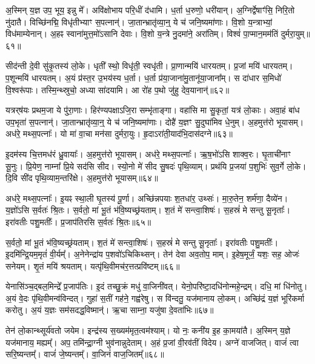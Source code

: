 अ॒स्मिन् य॒ज्ञ उप॒ भूय॒ इन्नु मे᳚।
अवि॑क्षोभाय परि॒धीं द॑धामि।
ध॒र्ता ध॒रुणो॒ धरी॑यान्।
अ॒ग्निर्द्वेषाꣳ॑सि॒ निरि॒तो नु॑दातै।
विच्छि॑नद्मि॒ विधृ॑तीभ्याꣳ स॒पत्नान्॑।
जा॒तान्भ्रातृ॑व्या॒न्॒ ये च॑ जनि॒ष्यमा॑णाः।
वि॒शो य॒न्त्राभ्यां॒ विध॑माम्येनान्।
अ॒हꣴ स्वाना॑मुत्त॒मो॑\-ऽसानि देवाः।
वि॒शो य॒न्त्रे नु॒दमा॑ने॒ अरा॑तिम्।
विश्वं॑ पा॒प्मान॒मम॑तिं दुर्मरा॒युम्॥६१॥\ip

सीद॑न्ती दे॒वी सु॑कृ॒तस्य॑ लो॒के।
धृती᳚ स्थो॒ विधृ॑ती॒ स्वधृ॑ती।
प्रा॒णान्मयि॑ धारयतम्।
प्र॒जां मयि॑ धारयतम्।
प॒शून्मयि॑ धारयतम्।
अ॒यं प्र॑स्त॒र उ॒भय॑स्य ध॒र्ता।
ध॒र्ता प्र॑या॒जाना॑मु॒तानू॑या॒जाना᳚म्।
स दा॑धार स॒मिधो॑ वि॒श्वरू॑पाः।
तस्मि॒न्थ्स्रुचो॒ अध्या सा॑दयामि।
आ रो॑ह प॒थो जु॑हु देव॒यानान्॑॥६२॥\ip

यत्रर्‌\mbox{}ष॑यः प्रथम॒जा ये पु॑रा॒णाः।
हिर॑ण्यपक्षा\-ऽजि॒रा सम्भृ॑ताङ्गा।
वहा॑सि मा सु॒कृतां॒ यत्र॑ लो॒काः।
अवा॒हं बा॑ध उप॒भृता॑ स॒पत्नान्॑।
जा॒तान्भ्रातृ॑व्या॒न्॒ ये च॑ जनि॒ष्यमा॑णाः।
दोहै॑ य॒ज्ञꣳ सु॒दुघा॑मिव धे॒नुम्।
अ॒हमुत्त॑रो भूयासम्।
अध॑रे॒ मथ्स॒पत्नाः᳚।
यो मा॑ वा॒चा मन॑सा दुर्मरा॒युः।
हृ॒दा\-ऽरा॑ती॒याद॑भि॒दास॑दग्ने॥६३॥\ip

इ॒दम॑स्य चि॒त्तमध॑रं ध्रु॒वायाः᳚।
अ॒हमुत्त॑रो भूयासम्।
अध॑रे॒ मथ्स॒पत्नाः᳚।
ऋ॒ष॒भो॑ऽसि शाक्व॒रः।
घृ॒ताची॑नाꣳ सू॒नुः।
प्रि॒येण॒ नाम्ना᳚ प्रि॒ये सद॑सि सीद।
स्यो॒नो मे॑ सीद सु॒षदः॑ पृथि॒व्याम्।
प्रथ॑यि प्र॒जया॑ प॒शुभिः॑ सुव॒र्गे लो॒के।
दि॒वि सी॑द पृथि॒व्याम॒न्तरि॑क्षे।
अ॒हमुत्त॑रो भूयासम्॥६४॥\ip\phantom{त्त॑}%

अध॑रे॒ मथ्स॒पत्नाः᳚।
इ॒यꣴ स्था॒ली घृ॒तस्य॑ पू॒र्णा।
अच्छि॑न्नपयाः श॒तधा॑र॒ उथ्सः॑।
मा॒रु॒तेन॒ शर्म॑णा॒ दैव्ये॑न।
य॒ज्ञो॑ऽसि स॒र्वतः॑ श्रि॒तः।
स॒र्वतो॒ मां भू॒तं भ॑वि॒ष्यच्छ्र॑यताम्।
श॒तं मे॑ सन्त्वा॒शिषः॑।
स॒हस्रं॑ मे सन्तु सू॒नृताः᳚।
इरा॑वतीः पशु॒मतीः᳚।
प्र॒जा\-प॑तिरसि स॒र्वतः॑ श्रि॒तः॥६५॥\ip

स॒र्वतो॒ मां भू॒तं भ॑वि॒ष्यच्छ्र॑यताम्।
श॒तं मे॑ सन्त्वा॒शिषः॑।
स॒हस्रं॑ मे सन्तु सू॒नृताः᳚।
इरा॑वतीः पशु॒मतीः᳚।
इ॒दमि॑न्द्रि॒यम॒मृतं॑ वी॒र्यम्᳚।
अ॒नेनेन्द्रा॑य प॒शवो॑\-ऽचिकिथ्सन्।
तेन॑ देवा अव॒तोप॒ माम्।
इ॒हेष॒मूर्जं॒ यशः॒ सह॒ ओजः॑ सनेयम्।
शृ॒तं मयि॑ श्रयताम्।
यत्पृ॑थि॒वीमच॑र॒त्तत्प्रवि॑ष्टम्॥६६॥\ip

येनासि॑ञ्च॒द्बल॒मिन्द्रे᳚ प्र॒जा\-प॑तिः।
इ॒दं तच्छु॒क्रं मधु॑ वा॒जिनी॑वत्।
येनो॒परि॑ष्टा॒दधि॑नोन्महे॒\-न्द्रम्।
दधि॒ मां धि॑नोतु।
अ॒यं वे॒दः पृ॑थि॒वीमन्व॑विन्दत्।
गुहा॑ स॒तीं गह॑ने॒ गह्व॑रेषु।
स वि॑न्दतु॒ यज॑मानाय लो॒कम्।
अच्छि॑द्रं य॒ज्ञं भूरि॑कर्मा करोतु।
अ॒यं य॒ज्ञः सम॑सदद्ध॒विष्मान्॑।
ऋ॒चा साम्ना॒ यजु॑षा दे॒वता॑भिः॥६७॥\ip

तेन॑ लो॒कान्थ्सूर्य॑वतो जयेम।
इन्द्र॑स्य स॒ख्यम॑मृत॒त्वम॑\-श्याम्।
यो नः॒ कनी॑य इ॒ह का॒मया॑तै।
अ॒स्मिन् य॒ज्ञे यज॑मानाय॒ मह्यम्᳚।
अप॒ तमि॑न्द्रा॒ग्नी भुव॑नान्नुदेताम्।
अ॒हं प्र॒जां वी॒रव॑तीं विदेय।
अग्ने॑ वाजजित्।
वाजं॑ त्वा सरि॒ष्यन्तम्᳚।
वाजं॑ जे॒ष्यन्तम्᳚।
वा॒जिनं॑ वाज॒जितम्᳚॥६८॥\ip

